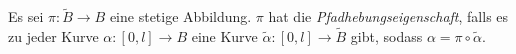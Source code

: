 Es sei $\pi\colon \widetilde{B}\to B$ eine stetige Abbildung. \pause $\pi$ hat die \emph{Pfadhebungseigenschaft}, \pause falls es zu jeder Kurve $\alpha\colon [0,l]\to B$ eine Kurve $\widetilde{\alpha}\colon [0,l]\to\widetilde{B}$ gibt, \pause sodass $\alpha=\pi\circ \widetilde{\alpha}$.